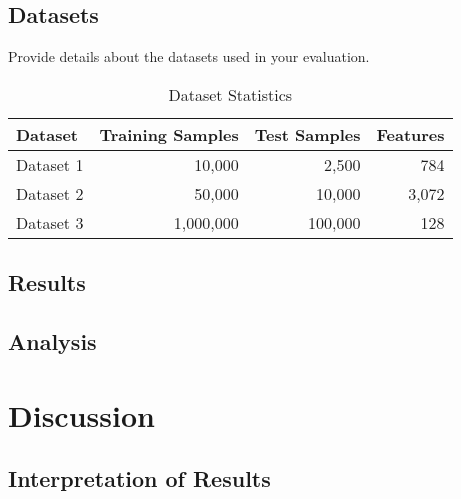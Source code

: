 \documentclass[11pt,a4paper]{article}
\begin{document}
\subsection{Datasets}
\label{subsec:datasets}

Provide details about the datasets used in your evaluation.

\begin{table}[htbp]
\centering
\caption{Dataset Statistics}
\label{tab:datasets}
\begin{tabular}{@{}lrrr@{}}
\toprule
Dataset & Training Samples & Test Samples & Features \\
\midrule
Dataset 1 & 10,000 & 2,500 & 784 \\
Dataset 2 & 50,000 & 10,000 & 3,072 \\
Dataset 3 & 1,000,000 & 100,000 & 128 \\
\bottomrule
\end{tabular}
\end{table}

\subsection{Results}
\label{subsec:results}


\subsection{Analysis}
\label{subsec:analysis}


\section{Discussion}
\label{sec:discussion}


\subsection{Interpretation of Results}
\label{subsec:interpretation}
\end{document}
